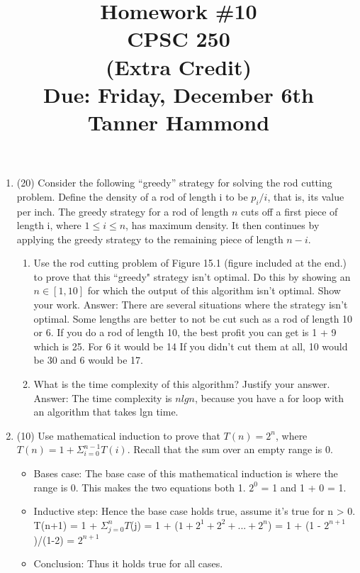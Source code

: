 \documentclass[12pt]{article}
\begin{document}

\title{Homework \#10 \\ CPSC 250 \\ (Extra Credit)\\ Due: Friday, December 6th \\ Tanner Hammond}
\date{}

\maketitle

\begin{enumerate}
\item (20)
Consider the following ``greedy” strategy for solving the rod cutting problem.
Define the density of a rod of length i to be $p_i/i$, that is, its value per inch.
The greedy strategy for a rod of length $n$ cuts off a first piece of length i, where
$1 \leq i \leq n$, has maximum density. It then continues by applying the greedy strategy to 
the remaining piece of length $n-i$.

\begin{enumerate}
\item Use the rod cutting problem of Figure 15.1 (figure included at the end.) to prove that 
this ``greedy" strategy isn't optimal. Do this by showing an $n \in [1,10]$ for which the output 
of this algorithm isn't optimal. Show your work.
\newline Answer: There are several situations where the strategy isn't optimal. Some lengths are better to not be cut such as a rod of length 10 or 6. If you do a rod of length 10, the best profit you can get is 1 + 9 which is 25. For 6 it would be 14 If you didn't cut them at all, 10 would be 30 and 6 would be 17.
\item What is the time complexity of this algorithm? Justify your answer. \newline Answer: The time complexity is $nlgn$, because you have a for loop with an algorithm that takes lgn time.
\end{enumerate}

\item (10)
Use mathematical induction to prove that $T(n) = 2^n$, where
$T(n) = 1 + \Sigma_{i = 0}^{n-1} T(i).$ Recall that the sum over an empty range is 0.
\begin{itemize}
\item Bases case: The base case of this mathematical induction is where the range is 0. This makes the two equations both 1. $2^0$ = 1 and 1 + 0 = 1.
\item Inductive step: Hence the base case holds true, assume it's true for n > 0. T(n+1) = 1 + $\Sigma_{j=0}^{n}T$(j) = 1 + ($1+2^1 + 2^2+ ... + 2^n$) = 1 + (1 - $2^{n+1}$)/(1-2) = $2^{n+1}$
\item Conclusion: Thus it holds true for all cases.
\end{itemize}


\end{enumerate}
\end{document}
